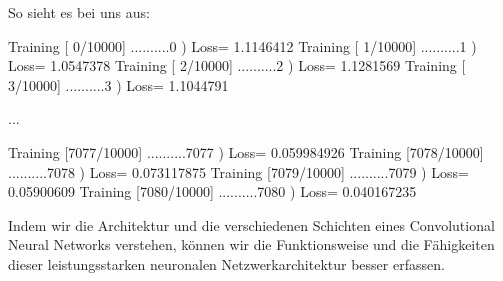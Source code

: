 So sieht es bei uns aus:

Training [   0/10000] ..........0 ) Loss= 1.1146412
Training [   1/10000] ..........1 ) Loss= 1.0547378
Training [   2/10000] ..........2 ) Loss= 1.1281569
Training [   3/10000] ..........3 ) Loss= 1.1044791

...

Training [7077/10000] ..........7077 ) Loss= 0.059984926
Training [7078/10000] ..........7078 ) Loss= 0.073117875
Training [7079/10000] ..........7079 ) Loss= 0.05900609
Training [7080/10000] ..........7080 ) Loss= 0.040167235



Indem wir die Architektur und die verschiedenen Schichten eines Convolutional Neural Networks verstehen, können wir die Funktionsweise und die Fähigkeiten dieser leistungsstarken neuronalen Netzwerkarchitektur besser erfassen.
